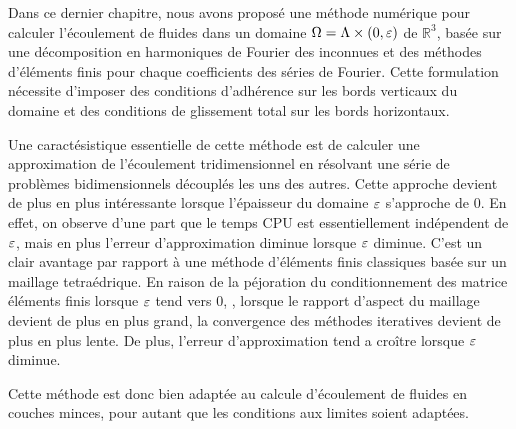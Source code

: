 Dans ce dernier chapitre, nous avons proposé une méthode numérique
pour calculer l'écoulement de fluides dans un domaine
$\Omega = \Lambda\times(0,\varepsilon)$ de $\mathbb R^3$, basée sur une
décomposition en harmoniques de Fourier des inconnues et des
méthodes d'éléments finis pour chaque coefficients des séries de
Fourier. Cette formulation nécessite d'imposer des conditions
d'adhérence sur les bords verticaux du domaine et des conditions de
glissement total sur les bords horizontaux.

Une caractésistique essentielle de cette méthode est de calculer une
approximation de l'écoulement tridimensionnel en résolvant une
série de problèmes bidimensionnels découplés les uns des autres. Cette
approche devient de plus en plus intéressante lorsque l'épaisseur du
domaine $\varepsilon$ s'approche de 0. En effet, on observe d'une part
que le temps CPU est essentiellement indépendent de $\varepsilon$, mais
en plus l'erreur d'approximation diminue lorsque $\varepsilon$
diminue. C'est un clair avantage par rapport à une méthode
d'éléments finis classiques basée sur un maillage tetraédrique. En
raison de la péjoration du conditionnement des matrice éléments
finis lorsque $\varepsilon$ tend vers 0, \ie, lorsque le rapport
d'aspect du maillage devient de plus en plus grand, la convergence des
méthodes iteratives devient de plus en plus lente. De plus, l'erreur
d'approximation tend a croître lorsque $\varepsilon$ diminue.

Cette méthode est donc bien adaptée au calcule d'écoulement de
fluides en couches minces, pour autant que les conditions aux limites
soient adaptées.
